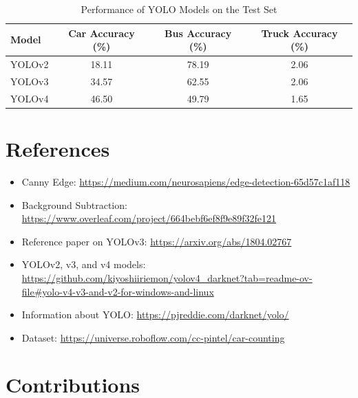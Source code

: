 \documentclass{article}
\begin{document}
\begin{table}[H]
    \centering
    \begin{tabular}{|l|c|c|c|}
    \hline
    \textbf{Model} & \textbf{Car Accuracy (\%)} & \textbf{Bus Accuracy (\%)} & \textbf{Truck Accuracy (\%)} \\
    \hline
    YOLOv2 & 18.11 & 78.19 & 2.06 \\
    \hline
    YOLOv3 & 34.57 & 62.55 & 2.06 \\
    \hline
    YOLOv4 & 46.50 & 49.79 & 1.65 \\
    \hline
    \end{tabular}
    \caption{Performance of YOLO Models on the Test Set}
    \label{tab:yolo_performance}
\end{table}


\section{References}
\begin{itemize}
    \item Canny Edge: 
    \url{https://medium.com/neurosapiens/edge-detection-65d57c1af118}
    \item Background Subtraction: \url{https://www.overleaf.com/project/664bebf6ef8f9e89f32fe121}
    \item Reference paper on YOLOv3: \url{https://arxiv.org/abs/1804.02767}
    \item YOLOv2, v3, and v4 models: \url{https://github.com/kiyoshiiriemon/yolov4_darknet?tab=readme-ov-file#yolo-v4-v3-and-v2-for-windows-and-linux}
    \item Information about YOLO: \url{https://pjreddie.com/darknet/yolo/}
    \item Dataset: \url{https://universe.roboflow.com/cc-pintel/car-counting}
\end{itemize}

\section{Contributions}
\end{document}
